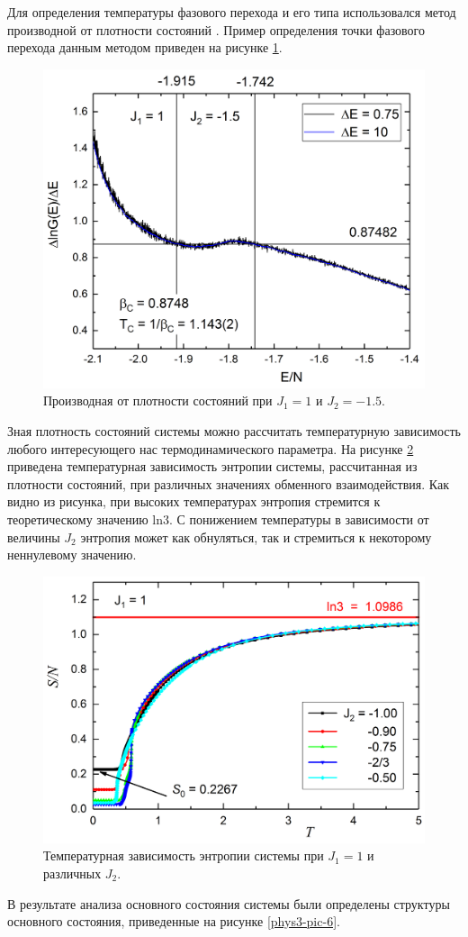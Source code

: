 Для определения температуры фазового перехода и его типа использовался метод производной от плотности состояний \cite{phys3-bib-7}. Пример определения точки фазового перехода данным методом приведен на рисунке \ref{phys3-pic-4}.

\begin{figure}[H]
	\centering
	\includegraphics[width=0.5\linewidth]{content/sections/images/phys3-4}
	\caption{Производная от плотности состояний при $J_1 = 1$ и $J_2 = -1.5$.}
	\label{phys3-pic-4}
\end{figure}

Зная плотность состояний системы можно рассчитать температурную зависимость любого интересующего нас термодинамического параметра. На рисунке \ref{phys3-pic-5} приведена температурная зависимость энтропии системы, рассчитанная из плотности состояний, при различных значениях обменного взаимодействия. Как видно из рисунка, при высоких температурах энтропия стремится к теоретическому значению ln3. С понижением температуры в зависимости от величины $J_2$ энтропия может как обнуляться, так и стремиться к некоторому неннулевому значению.

\begin{figure}[H]
	\centering
	\includegraphics[width=0.5\linewidth]{content/sections/images/phys3-5}
	\caption{Температурная зависимость энтропии системы при $J_1 = 1$ и различных $J_2$.}
	\label{phys3-pic-5}
\end{figure}

В результате анализа основного состояния системы были определены структуры основного состояния, приведенные на рисунке \ref{phys3-pic-6}.

